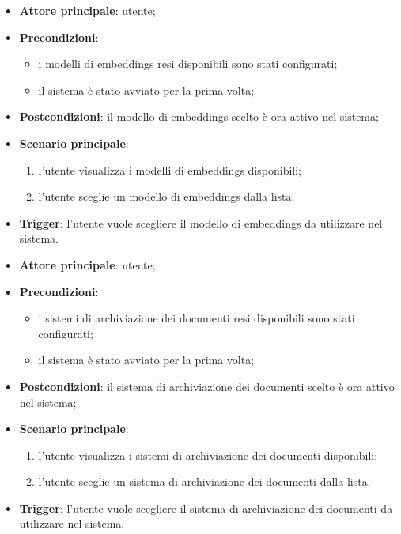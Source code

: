 \documentclass[10pt, a4paper]{article}
\begin{document}
    \begin{itemize}
        \item \textbf{Attore principale}: utente;
        \item \textbf{Precondizioni}: 
        \begin{itemize}
            \item i modelli di embeddings resi disponibili sono stati configurati;
            \item il sistema è stato avviato per la prima volta;
        \end{itemize}
        \item \textbf{Postcondizioni}: il modello di embeddings scelto è ora attivo nel sistema;
        \item \textbf{Scenario principale}:
            \begin{enumerate}
                \item l’utente visualizza i modelli di embeddings disponibili;
                \item l’utente sceglie un modello di embeddings dalla lista.
            \end{enumerate}
        \item \textbf{Trigger}: l’utente vuole scegliere il modello di embeddings da utilizzare nel sistema.
    \end{itemize}

    \begin{itemize}
        \item \textbf{Attore principale}: utente;
        \item \textbf{Precondizioni}:
        \begin{itemize}
            \item i sistemi di archiviazione dei documenti resi disponibili sono stati configurati;
            \item il sistema è stato avviato per la prima volta;
        \end{itemize}
        \item \textbf{Postcondizioni}: il sistema di archiviazione dei documenti scelto è ora attivo nel sistema;
        \item \textbf{Scenario principale}:
            \begin{enumerate}
                \item l’utente visualizza i sistemi di archiviazione dei documenti disponibili;
                \item l’utente sceglie un sistema di archiviazione dei documenti dalla lista.
            \end{enumerate}
        \item \textbf{Trigger}: l’utente vuole scegliere il sistema di archiviazione dei documenti da utilizzare nel sistema.
    \end{itemize}
    
\end{document}
